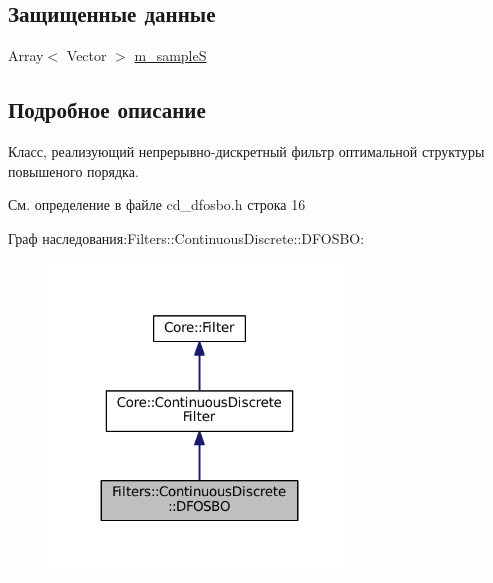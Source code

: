 \subsection*{Защищенные данные}
\begin{DoxyCompactItemize}
\item 
Array$<$ Vector $>$ \hyperlink{class_filters_1_1_continuous_discrete_1_1_d_f_o_s_b_o_affccb91872f23878db490d487c481606}{m\+\_\+sampleS}
\end{DoxyCompactItemize}


\subsection{Подробное описание}
Класс, реализующий непрерывно-\/дискретный фильтр оптимальной структуры повышеного порядка. 

См. определение в файле cd\+\_\+dfosbo.\+h строка 16



Граф наследования\+:Filters\+:\+:Continuous\+Discrete\+:\+:D\+F\+O\+S\+BO\+:\nopagebreak
\begin{figure}[H]
\begin{center}
\leavevmode
\includegraphics[width=227pt]{class_filters_1_1_continuous_discrete_1_1_d_f_o_s_b_o__inherit__graph}
\end{center}
\end{figure}


